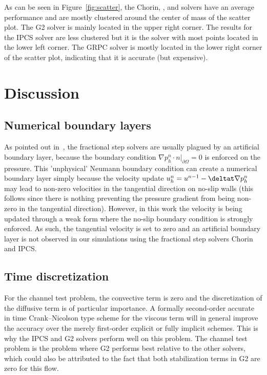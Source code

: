 As can be seen in Figure~\ref{fig:scatter}, the Chorin, , and
 solvers have an average performance and are mostly clustered
around the center of mass of the scatter plot. The G2 solver is mainly
located in the upper right corner. The results for the IPCS solver are
less clustered but it is the solver with most points located in the
lower left corner. The GRPC solver is mostly located in the lower right
corner of the scatter plot, indicating that it is accurate (but
expensive).

\section{Discussion}
\label{Discussion}

\subsection{Numerical boundary layers}

As pointed out in~\cite{GuermondMinevShen2006}, the fractional step solvers are
usually plagued by an artificial boundary layer, because the boundary
condition $ \nabla p^n_h \cdot n |_{\partial\Omega}=0$ is enforced on
the pressure. This 'unphysical' Neumann boundary condition can create
a numerical boundary layer simply because the velocity update
$u^{n}_h=u^{n-1}-\deltat\nabla p^n_h$ may lead to non-zero velocities in
the tangential direction on no-slip walls (this follows since there is
nothing preventing the pressure gradient from being non-zero in the
tangential direction). However, in this work the velocity is being
updated through a weak form where the no-slip boundary condition is
strongly enforced. As such, the tangential velocity is set to zero and
an artificial boundary layer is not observed in our simulations using
the fractional step solvers Chorin and IPCS.

\subsection{Time discretization}

For the channel test problem, the convective term is zero and the
discretization of the diffusive term is of particular importance. A
formally second-order accurate in time Crank--Nicolson type scheme for
the viscous term will in general improve the accuracy over the merely
first-order explicit or fully implicit schemes. This is why the IPCS
and G2 solvers perform well on this problem. The channel test problem
is the problem where G2 performs best relative to the other solvers,
which could also be attributed to the fact that both stabilization
terms in G2 are zero for this flow.

